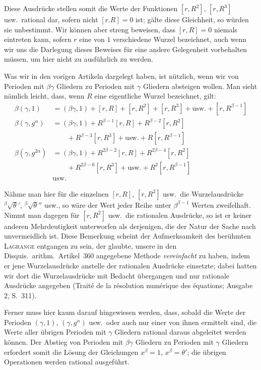 Diese Ausdrücke stellen somit die Werte der Funktionen $[r,R^2]$, $[r,R^3]$ usw.\ rational dar, sofern nicht $[r.R]=0$ ist; gälte diese Gleichheit, so würden sie unbestimmt. Wir können aber streng beweisen, dass $[r,R]=0$ niemals eintreten kann, sofern $r$ eine von $1$ verschiedene Wurzel bezeichnet, auch wenn wir uns die Darlegung dieses Beweises für eine andere Gelegenheit vorbehalten müssen, um hier nicht zu ausführlich zu werden.

Was wir in den vorigen Artikeln dargelegt haben, ist nützlich, wenn wir von Perioden mit $\beta\gamma$ Gliedern zu Perioden mit $\gamma$ Gliedern absteigen wollen. Man sieht nämlich leicht, dass, wenn $R$ eine eigentliche Wurzel bezeichnet, gilt:
\[
\begin{aligned}
\beta(\gamma,1)&=(\beta\gamma,1)+[r,R]+[r,R^2]+[r,R^3]+\text{usw.}+[r,R^{\beta-1}]\\
\beta(\gamma,g^\alpha)&=(\beta\gamma,1)+R^{\beta-1}[r,R]+R^{\beta-2}[r,R^2]\\
&\qquad{}+R^{\beta-3}[r,R^3]+\text{usw.}+R[r,R^{\beta-1}]\\
\beta(\gamma,g^{2\alpha})&=(\beta\gamma,1)+R^{2\beta-2}[r,R]+R^{2\beta-4}[r,R^2]\\
&\qquad{}+R^{2\beta-6}[r,R^3]+\text{usw.}+R^2[r,R^{\beta-1}]\\
&\text{usw.}
\end{aligned}
\]

Nähme man hier für die einzelnen $[r,R]$, $[r,R^2]$ usw.\ die Wurzelausdrücke ${}^{\beta}\!\surd\theta'$, ${}^{\beta}\!\surd\theta''$ usw., so wäre der Wert jeder Reihe unter $\beta^{\beta-1}$ Werten zweifelhaft. Nimmt man dagegen für $[r,R^2]$ usw.\ die rationalen Ausdrücke, so ist er keiner anderen Mehrdeutigkeit unterworfen als derjenigen, die der Natur der Sache nach unvermeidlich ist. Diese Bemerkung scheint der Aufmerksamkeit des berühmten \textsc{Lagrange} entgangen zu sein, der glaubte, unsere in den Disquis.\ arithm.\ Artikel~360 angegebene Methode \emph{vereinfacht} zu haben, indem er jene Wurzelausdrücke anstelle der rationalen Ausdrücke einsetzte; dabei hatten wir dort die Wurzelausdrücke mit Bedacht übergangen und nur rationale Ausdrücke angegeben (Traité de la résolution numérique des équations; Ausgabe $2$, S.\ 311).

Ferner muss hier kaum darauf hingewiesen werden, dass, sobald die Werte der Perioden $(\gamma,1)$, $(\gamma,g^\alpha)$ usw.\ oder auch nur einer von ihnen ermittelt sind, die Werte aller übrigen Perioden mit $\gamma$ Gliedern rational daraus abgeleitet werden können. Der Abstieg von Perioden mit $\beta\gamma$ Gliedern zu Perioden mit $\gamma$ Gliedern erfordert somit die Lösung der Gleichungen $x^\beta=1$, $x^\beta=\theta'$; die übrigen Operationen werden rational ausgeführt.
